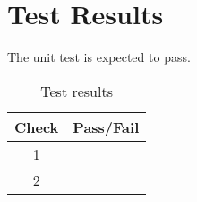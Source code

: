 \section{Test Results}
The unit test is expected to pass.
\begin{table}[H]
	\caption{Test results}
	\label{tab:results}
	\centering \fontsize{10}{10}\selectfont
	\begin{tabular}{c | c  } %
		\hline\hline
		\textbf{Check} &\textbf{Pass/Fail} \\ 
		\hline
	   1	   			&  \\ 
	   2	   			&  \\ 
	   \hline\hline
	\end{tabular}
\end{table}


